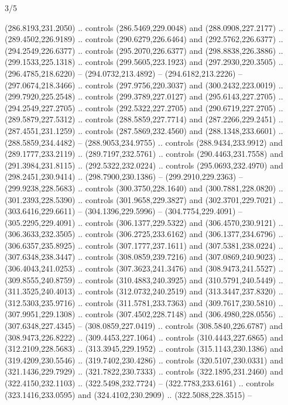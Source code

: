 \begin{flagdescription}{3/5}
\begin{scope}[xshift=0.5\flaglength,yshift=0.5\flagwidth,scale=\flagwidth/270]
\begin{scope}[y=0.8pt, x=0.8pt, yscale=-1,shift={(-281.25,-168.75)}]
  (286.8193,231.2050) .. controls (286.5469,229.0048) and (288.0908,227.2177) ..
  (289.4502,226.9189) .. controls (290.6279,226.6464) and (292.5762,226.6377) ..
  (294.2549,226.6377) .. controls (295.2070,226.6377) and (298.8838,226.3886) ..
  (299.1533,225.1318) .. controls (299.5605,223.1923) and (297.2930,220.3505) ..
  (296.4785,218.6220) -- (294.0732,213.4892) -- (294.6182,213.2226) --
  (297.0674,218.3466) .. controls (297.9756,220.3037) and (300.2432,223.0019) ..
  (299.7920,225.2548) .. controls (299.3789,227.0127) and (295.6143,227.2705) ..
  (294.2549,227.2705) .. controls (292.5322,227.2705) and (290.6719,227.2705) ..
  (289.5879,227.5312) .. controls (288.5859,227.7714) and (287.2266,229.2451) ..
  (287.4551,231.1259) .. controls (287.5869,232.4560) and (288.1348,233.6601) ..
  (288.5859,234.4482) -- (288.9053,234.9755) .. controls (288.9434,233.9912) and
  (289.1777,233.2119) .. (289.7197,232.5761) .. controls (290.4463,231.7558) and
  (291.3984,231.8115) .. (292.5322,232.0224) .. controls (295.0693,232.4970) and
  (298.2451,230.9414) .. (298.7900,230.1386) -- (299.2910,229.2363) --
  (299.9238,228.5683) .. controls (300.3750,228.1640) and (300.7881,228.0820) ..
  (301.2393,228.5390) .. controls (301.9658,229.3827) and (302.3701,229.7021) ..
  (303.6416,229.6611) -- (304.1396,229.5996) -- (304.7754,229.4091) --
  (305.2295,229.4091) .. controls (306.1377,229.5322) and (306.4570,230.9121) ..
  (306.3633,232.3505) .. controls (306.2725,233.6162) and (306.1377,234.6796) ..
  (306.6357,235.8925) .. controls (307.1777,237.1611) and (307.5381,238.0224) ..
  (307.6348,238.3447) .. controls (308.0859,239.7216) and (307.0869,240.9023) ..
  (306.4043,241.0253) .. controls (307.3623,241.3476) and (308.9473,241.5527) ..
  (309.8555,240.8759) .. controls (310.4883,240.3925) and (310.5791,240.5449) ..
  (311.3525,240.4013) .. controls (312.0732,240.2519) and (313.3447,237.8320) ..
  (312.5303,235.9716) .. controls (311.5781,233.7363) and (309.7617,230.5810) ..
  (307.9951,229.1308) .. controls (307.4502,228.7148) and (306.4980,228.0556) ..
  (307.6348,227.4345) -- (308.0859,227.0419) .. controls (308.5840,226.6787) and
  (308.9473,226.8222) .. (309.4453,227.1064) .. controls (310.4443,227.6865) and
  (312.2109,228.5683) .. (313.3945,229.1952) .. controls (315.1143,230.1386) and
  (319.4209,230.5546) .. (319.7402,230.4286) .. controls (320.5107,230.0331) and
  (321.1436,229.7929) .. (321.7822,230.7333) .. controls (322.1895,231.2460) and
  (322.4150,232.1103) .. (322.5498,232.7724) -- (322.7783,233.6161) .. controls
  (323.1416,233.0595) and (324.4102,230.2909) .. (322.5088,228.3515) --

\end{scope}
\end{scope}
\end{flagdescription}
